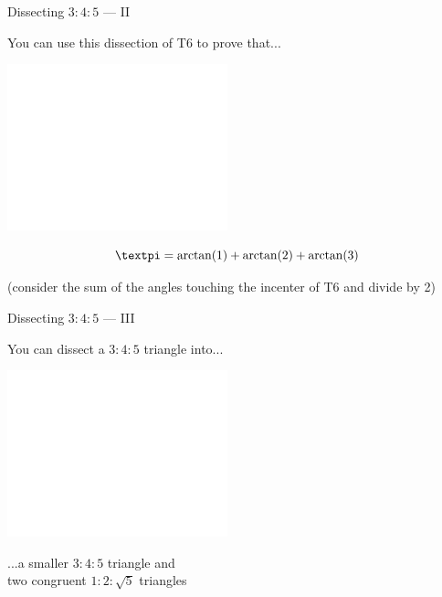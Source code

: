 \documentclass[14pt]{beamer}
\begin{document}

    \begin{frame}{Dissecting $3\!\!:\!\!4\!\!:\!\!5$ --- II}
        \begin{center}
            You can use this dissection of T6 to prove that...

            \bigskip\bigskip

            \includegraphics[height=18ex]{figures/figure006c.pdf}\vspace{-1em}

            $$\text{\textpi} = \arctan{\!\left(1\right)} + \arctan{\!\left(2\right)} + \arctan{\!\left(3\right)}$$

            {\footnotesize(consider the sum of the angles touching the incenter of T6 and divide by 2)}
        \end{center}
    \end{frame}


    \begin{frame}{Dissecting $3\!\!:\!\!4\!\!:\!\!5$ --- III}
        \begin{center}
            You can dissect a $3\!\!:\!\!4\!\!:\!\!5$ triangle into...

            \bigskip \bigskip

            \includegraphics[height=18ex]{figures/figure006d.pdf}

            \bigskip \bigskip

            ...a smaller $3\!\!:\!\!4\!\!:\!\!5$ triangle and\\two congruent $1\!\!:\!\!2\!\!:\!\!\sqrt{5}$ triangles
        \end{center}
    \end{frame}
\end{document}
